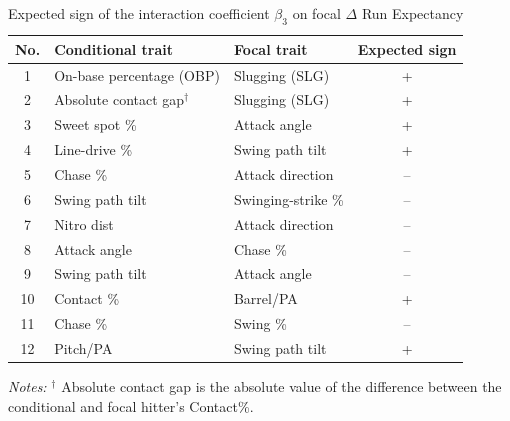 \begin{table}[htbp]
\centering
\caption{Expected sign of the interaction coefficient $\beta_3$ on focal $\Delta$ Run Expectancy}
\label{tab:expectations_focal}
\begin{tabular}{c l l c}
\toprule
No. & Conditional trait & Focal trait & Expected sign \\
\midrule
1 & On-base percentage (OBP) & Slugging (SLG) & + \\
2 & Absolute contact gap$^{\dagger}$ & Slugging (SLG) & + \\
3 & Sweet spot \% & Attack angle & + \\
4 & Line-drive \% & Swing path tilt & + \\
5 & Chase \% & Attack direction & -- \\
6 & Swing path tilt & Swinging-strike \% & -- \\
7 & Nitro dist & Attack direction & -- \\
8 & Attack angle & Chase \% & -- \\
9 & Swing path tilt & Attack angle & -- \\
10 & Contact \% & Barrel/PA & + \\
11 & Chase \% & Swing \% & -- \\
12 & Pitch/PA & Swing path tilt & + \\
\bottomrule
\end{tabular}

\vspace{4pt}
\begin{minipage}{0.8\textwidth}
\centering
\footnotesize
\textit{Notes:} $^{\dagger}$ Absolute contact gap is the absolute value of the difference between the conditional and focal hitter's Contact\%.
\end{minipage}
\end{table}
